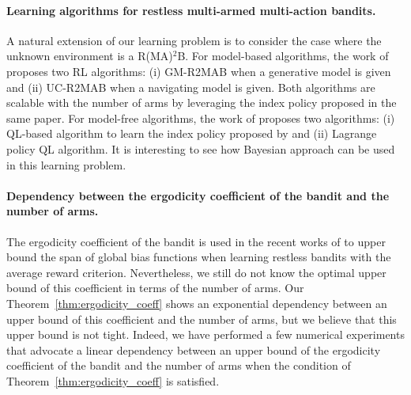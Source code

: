 \paragraph{Learning algorithms for restless multi-armed multi-action bandits.}
A natural extension of our learning problem is to consider the case where the unknown environment is a R(MA)$^2$B.
For model-based algorithms, the work of \cite{xiong2022learning} proposes two RL algorithms: (i) GM-R2MAB when a generative model is given and (ii) UC-R2MAB when a navigating model is given.
Both algorithms are scalable with the number of arms by leveraging the index policy proposed in the same paper.
For model-free algorithms, the work of \cite{killian2021q} proposes two algorithms: (i) QL-based algorithm to learn the index policy proposed by \cite{glazebrook2011general} and (ii) Lagrange policy QL algorithm.
It is interesting to see how Bayesian approach can be used in this learning problem.

\paragraph{Dependency between the ergodicity coefficient of the bandit and the number of arms.}
The ergodicity coefficient of the bandit is used in the recent works of \cite{akbarzadeh2022learning, xiong2022learning} to upper bound the span of global bias functions when learning restless bandits with the average reward criterion.
Nevertheless, we still do not know the optimal upper bound of this coefficient in terms of the number of arms. 
Our Theorem~\ref{thm:ergodicity_coeff} shows an exponential dependency between an upper bound of this coefficient and the number of arms, but we believe that this upper bound is not tight.
Indeed, we have performed a few numerical experiments that advocate a linear dependency between an upper bound of the ergodicity coefficient of the bandit and the number of arms when the condition of Theorem~\ref{thm:ergodicity_coeff} is satisfied.



\endgroup
